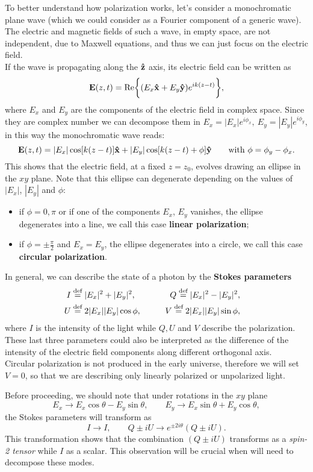 To better understand how polarization works, let's consider a monochromatic plane wave (which we could consider as a Fourier component of a generic wave). The electric and magnetic fields of such a wave, in empty space, are not independent, due to Maxwell equations, and thus we can just focus on the electric field.\\ 
If the wave is propagating along the $\mathbf{\hat{z}}$ axis, its electric field can be written as
$$ \mathbf{E}(z,t) = \text{Re}\bigg\{(E_{x}\mathbf{\hat{x}}+E_y\mathbf{\hat{y}})e^{ik(z-t)}\bigg\},$$
where $E_x$ and $E_y$ are the components of the electric field in complex space. Since they are complex number we can decompose them in $E_x=|E_x|e^{i\phi_x},\ E_y=|E_y|e^{i\phi_y}$, in this way the monochromatic wave reads:
$$ \mathbf{E}(z,t) = |E_x|\cos[k(z-t)]\versor x+|E_y|\cos[k(z-t)+\phi]\versor y \qquad\text{with}\ \phi=\phi_y-\phi_x.$$
This shows that the electric field, at a fixed $z=z_0$, evolves drawing an ellipse in the $xy$ plane. Note that this ellipse can degenerate depending on the values of $|E_x|$, $|E_y|$ and $\phi$:
\begin{itemize}
    \item if $\phi=0,\pi$ or if one of the components $E_x$, $E_y$ vanishes, the ellipse degenerates into a line, we call this case \textbf{linear polarization};
    \item if $\phi=\pm\frac{\pi}{2}$ and $E_x=E_y$, the ellipse degenerates into a circle, we call this case \textbf{circular polarization}.
\end{itemize}
In general, we can describe the state of a photon by the \textbf{Stokes parameters} 
\begin{align}\label{eq:stokes_parameters}
    I&\stackrel{\text{def}}{=} |E_x|^2+|E_y|^2,\qquad &Q\stackrel{\text{def}}{=} |E_x|^2-|E_y|^2,&&\nonumber\\ U&\stackrel{\text{def}}{=} 2|E_x||E_y|\cos\phi,\qquad &V\stackrel{\text{def}}{=} 2|E_x||E_y|\sin\phi,&&
\end{align}
where $I$ is the intensity of the light while $Q,U$ and $V$ describe the polarization. These last three parameters could also be interpreted as the difference of the intensity of the electric field components along different orthogonal axis.\\Circular polarization is not produced in the early universe, therefore we will set $V=0$, so that we are describing only linearly polarized or unpolarized light.

Before proceeding, we should note that under rotations in the $xy$ plane $$E_x\rightarrow E_x\cos\theta-E_y\sin\theta,\qquad E_y\rightarrow E_x\sin\theta+E_y\cos\theta,$$ the  Stokes parameters will transform as
$$I\rightarrow I,\qquad Q\pm iU\rightarrow e^{\pm 2i\theta}(Q\pm iU).$$
This transformation shows that the combination $(Q\pm iU)$ transforms as a \emph{spin-2 tensor} while $I$ as a scalar. This observation will be crucial when will need to decompose these modes.
